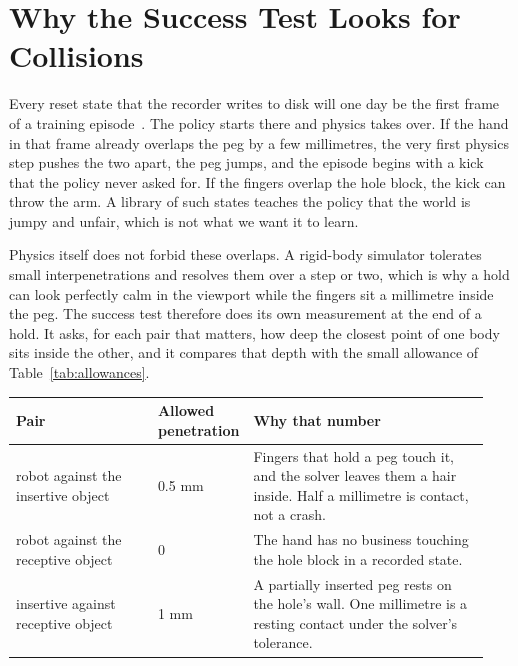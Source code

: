 \section{Why the Success Test Looks for Collisions}
\label{sec:why}

Every reset state that the recorder writes to disk will one day be the first frame of a training episode~\cite{omnireset2026}. The policy starts there and physics takes over. If the hand in that frame already overlaps the peg by a few millimetres, the very first physics step pushes the two apart, the peg jumps, and the episode begins with a kick that the policy never asked for. If the fingers overlap the hole block, the kick can throw the arm. A library of such states teaches the policy that the world is jumpy and unfair, which is not what we want it to learn.

Physics itself does not forbid these overlaps. A rigid-body simulator tolerates small interpenetrations and resolves them over a step or two, which is why a hold can look perfectly calm in the viewport while the fingers sit a millimetre inside the peg. The success test therefore does its own measurement at the end of a hold. It asks, for each pair that matters, how deep the closest point of one body sits inside the other, and it compares that depth with the small allowance of Table~\ref{tab:allowances}.

\begin{mytable}
\small
\begin{tabular}{@{}p{0.30\linewidth}p{0.14\linewidth}p{0.50\linewidth}@{}}
\toprule
Pair & Allowed penetration & Why that number \\
\midrule
robot against the insertive object & 0.5 mm & Fingers that hold a peg touch it, and the solver leaves them a hair inside. Half a millimetre is contact, not a crash. \\
robot against the receptive object & 0 & The hand has no business touching the hole block in a recorded state. \\
insertive against receptive object & 1 mm & A partially inserted peg rests on the hole's wall. One millimetre is a resting contact under the solver's tolerance. \\
\bottomrule
\end{tabular}
\end{mytable}

